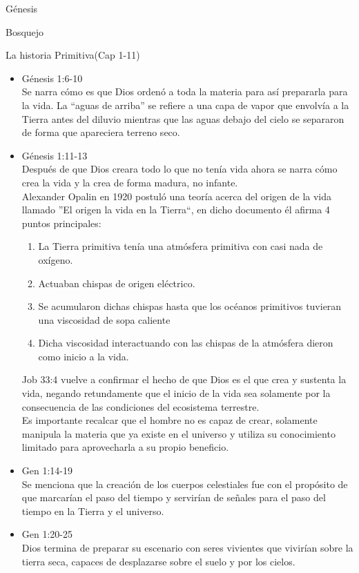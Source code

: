 \begin{section}{Génesis}
\begin{subsection}{Bosquejo}
\begin{subsubsection}{La historia Primitiva(Cap 1-11)}
\begin{enumerate}
\begin{itemize}
				\item Génesis 1:6-10\\
					Se narra cómo es que Dios ordenó a toda la materia para así prepararla para la vida. La ``aguas de arriba'' se refiere a una capa de vapor que envolvía a la Tierra antes del diluvio mientras que las aguas debajo del cielo se separaron de forma que apareciera terreno seco.

					\item Génesis 1:11-13\\
					Después de que Dios creara todo lo que no tenía vida ahora se narra cómo crea la vida y la crea de forma madura, no infante.\\
					Alexander Opalin en 1920 postuló una teoría acerca del origen de la vida llamado ''El origen la 					vida en la Tierra``, en dicho documento él afirma 4 puntos principales:
					\begin{enumerate}
						\item La Tierra primitiva tenía una atmósfera primitiva con  casi nada de oxígeno.
						\item Actuaban chispas de origen eléctrico.
						\item Se acumularon dichas chispas hasta que los océanos primitivos tuvieran una viscosidad de sopa caliente
						\item Dicha viscosidad interactuando con las chispas de la atmósfera dieron como inicio a la vida.						
					\end{enumerate}
					Job 33:4 vuelve a confirmar el hecho de que Dios es el que crea y sustenta la vida, negando retundamente que el inicio de la vida sea solamente por la consecuencia de las condiciones del ecosistema terrestre.\\
					Es importante recalcar que el hombre no es capaz de crear, solamente manipula la materia que ya existe en el universo y utiliza su conocimiento limitado para aprovecharla a su propio beneficio.
	

					\item Gen 1:14-19\\
					Se menciona que la creación de los cuerpos celestiales fue con el propósito de que  marcarían el paso del tiempo y servirían de	señales para el paso del tiempo en la Tierra y el universo.

				\item Gen 1:20-25\\
				Dios termina de preparar su escenario con seres vivientes que vivirían sobre la tierra seca, capaces de desplazarse sobre el suelo y por los cielos.



\end{itemize}
\end{enumerate}
\end{subsubsection}
\end{subsection}
\end{section}
